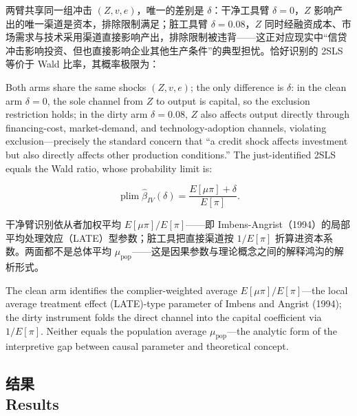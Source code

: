 \documentclass[12pt,a4paper]{ctexart}
\begin{document}
两臂共享同一组冲击 $(Z, v, e)$，唯一的差别是 $\delta$：干净工具臂 $\delta = 0$，$Z$ 影响产出的唯一渠道是资本，排除限制满足；脏工具臂 $\delta = 0.08$，$Z$ 同时经融资成本、市场需求与技术采用渠道直接影响产出，排除限制被违背——这正对应现实中“信贷冲击影响投资、但也直接影响企业其他生产条件”的典型担忧。恰好识别的 2SLS 等价于 Wald 比率，其概率极限为：

Both arms share the same shocks $(Z,v,e)$; the only difference is $\delta$: in the clean arm $\delta=0$, the sole channel from $Z$ to output is capital, so the exclusion restriction holds; in the dirty arm $\delta=0.08$, $Z$ also affects output directly through financing-cost, market-demand, and technology-adoption channels, violating exclusion—precisely the standard concern that “a credit shock affects investment but also directly affects other production conditions.” The just-identified 2SLS equals the Wald ratio, whose probability limit is:

\begin{equation}\label{eq:ivplim}
\operatorname{plim} \hat{\beta}_{IV}(\delta) = \frac{E[\mu\pi] + \delta}{E[\pi]} .
\end{equation}

干净臂识别依从者加权平均 $E[\mu\pi]/E[\pi]$——即 Imbens-Angrist（1994）的局部平均处理效应（LATE）型参数；脏工具把直接渠道按 $1/E[\pi]$ 折算进资本系数。两面都不是总体平均 $\mu_{\mathrm{pop}}$——这是因果参数与理论概念之间的解释鸿沟的解析形式。

The clean arm identifies the complier-weighted average $E[\mu\pi]/E[\pi]$—the local average treatment effect (LATE)-type parameter of Imbens and Angrist (1994); the dirty instrument folds the direct channel into the capital coefficient via $1/E[\pi]$. Neither equals the population average $\mu_{\mathrm{pop}}$—the analytic form of the interpretive gap between causal parameter and theoretical concept.

\subsection[结果]{结果\\[1pt]\normalsize Results}
\end{document}
